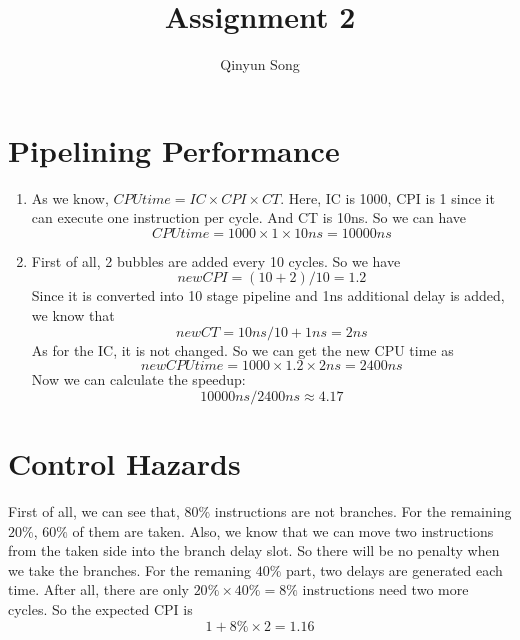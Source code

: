 \documentclass{article}
\title{Assignment 2}
\author{Qinyun Song}
\date{}
\begin{document}
    \maketitle

    \section{Pipelining Performance}
	\begin{enumerate}
	    \item As we know, $CPU time = IC \times CPI \times CT$. Here, IC is 1000, CPI is 1 since it can execute one instruction per cycle. And CT is 10ns. So we can have \begin{displaymath}
	    CPU time = 1000 \times 1 \times 10ns = 10000ns
	    \end{displaymath}
	    \item First of all, 2 bubbles are added every 10 cycles. So we have \begin{displaymath}
	    new CPI = (10 + 2) / 10 = 1.2
	\end{displaymath}
	Since it is converted into 10 stage pipeline and 1ns additional delay is added, we know that \begin{displaymath}
	    new CT = 10ns / 10 + 1ns = 2ns
	\end{displaymath}
	As for the IC, it is not changed. So we can get the new CPU time as \begin{displaymath}
	    new CPU time = 1000 \times 1.2 \times 2ns = 2400ns
	\end{displaymath}
	Now we can calculate the speedup:
	\begin{displaymath}
	    10000ns / 2400ns \approx 4.17
	\end{displaymath}
	\end{enumerate}

    \section{Control Hazards}
	First of all, we can see that, $80\%$ instructions are not branches. For the remaining $20\%$, $60\%$ of them are taken. Also, we know that we can move two instructions from the taken side into the branch delay slot. So there will be no penalty when we take the branches. For the remaning $40\%$ part, two delays are generated each time. After all, there are only $20\% \times 40\% = 8\%$ instructions need two more cycles. So the expected CPI is \begin{displaymath}
	1 + 8\% \times 2 = 1.16
	\end{displaymath}
\end{document}

